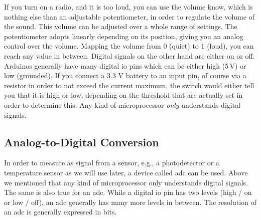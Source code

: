 If you turn on a radio, and it is too loud, you can use the volume know, which is nothing else than an adjustable potentiometer, in order to regulate the volume of the sound. This volume can be adjusted over a whole range of settings. The potentiometer adopts linearly depending on its position, giving you an analog control over the volume. Mapping the volume from 0 (quiet) to 1 (loud), you can reach any value in between. Digital signals on the other hand are either on or off. Arduinos generally have many digital \ac{io} pins which can be either high (5\,V) or low (grounded). If you connect a 3.3 V battery to an input pin, of course via a resistor in order to not exceed the current maximum, the switch would either tell you that it is high or low, depending on the threshold that are actually set in order to determine this. Any kind of microprocessor \textit{only} understands digital signals. 

\subsection{Analog-to-Digital Conversion}
In order to measure as signal from a sensor, e.g., a photodetector or a temperature sensor as we will use later, a device called \ac{adc} can be used. Above we mentioned that any kind of microprocessor only understands digital signals. The same is also true for an \ac{adc}. While a digital \ac{io} pin has two levels (high / on or low / off), an \ac{adc} generally has many more levels in between. The resolution of an \ac{adc} is generally expressed in bits.


